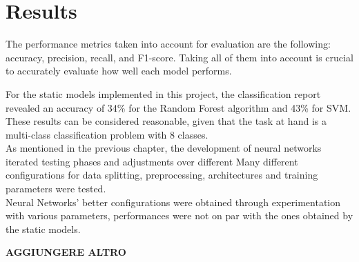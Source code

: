 \chapter*{Results}
\label{ch:results}
The performance metrics taken into account for evaluation are the following:
accuracy, precision, recall, and F1-score. Taking all of them into account
is crucial to accurately evaluate how well each model performs.

For the static models implemented in this project, the classification report
revealed an accuracy of 34\% for the Random Forest algorithm and 43\% for SVM. 
These results can be considered reasonable, given that the task at hand is a
multi-class classification problem with 8 classes.\\

As mentioned in the previous chapter, the development of neural networks
iterated testing phases and adjustments over different 
Many different configurations for data splitting, preprocessing, architectures and
training parameters were tested.\\

Neural Networks' better configurations were obtained through experimentation with
various parameters, performances were not on par with the ones obtained by the
static models. 

\textbf{AGGIUNGERE ALTRO}